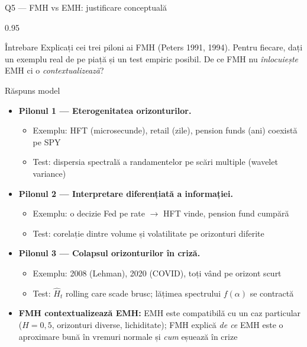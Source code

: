 \documentclass[9pt, aspectratio=169, t]{beamer}
\begin{document}
\begin{frame}[shrink=25]{Q5 --- FMH vs EMH: justificare conceptuală}
\begin{cminipage}{0.95\textwidth}
\begin{block}{Întrebare}
Explicați cei trei piloni ai FMH (Peters 1991, 1994). Pentru fiecare, dați un exemplu real de pe piață și un test empiric posibil. De ce FMH nu \emph{înlocuiește} EMH ci o \emph{contextualizează}?
\end{block}
\begin{exampleblock}{Răspuns model}
\begin{itemize}\setlength{\itemsep}{0pt}
    \item \textbf{Pilonul 1 --- Eterogenitatea orizonturilor.}
    \begin{itemize}\setlength{\itemsep}{0pt}
        \item Exemplu: HFT (microsecunde), retail (zile), pension funds (ani) coexistă pe SPY
        \item Test: dispersia spectrală a randamentelor pe scări multiple (wavelet variance)
    \end{itemize}
    \item \textbf{Pilonul 2 --- Interpretare diferențiată a informației.}
    \begin{itemize}\setlength{\itemsep}{0pt}
        \item Exemplu: o decizie Fed pe rate $\to$ HFT vinde, pension fund cumpără
        \item Test: corelație dintre volume și volatilitate pe orizonturi diferite
    \end{itemize}
    \item \textbf{Pilonul 3 --- Colapsul orizonturilor în criză.}
    \begin{itemize}\setlength{\itemsep}{0pt}
        \item Exemplu: 2008 (Lehman), 2020 (COVID), toți vând pe orizont scurt
        \item Test: $\hat H_t$ rolling care scade brusc; lățimea spectrului $f(\alpha)$ se contractă
    \end{itemize}
    \item \textbf{FMH contextualizează EMH:} EMH este compatibilă cu un caz particular ($H = 0{,}5$, orizonturi diverse, lichiditate); FMH explică \emph{de ce} EMH este o aproximare bună în vremuri normale și \emph{cum} eșuează în crize
\end{itemize}
\end{exampleblock}
\end{cminipage}
\end{frame}
\end{document}
